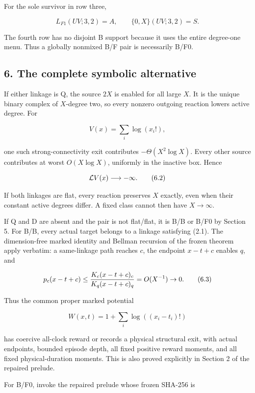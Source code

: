 For the sole survivor in row three,

\[
 L_{F1}(UV;3,2)=A,\qquad \{0,X\}(UV;3,2)=S.             \tag{5.2}
\]

The fourth row has no disjoint B support because it uses the entire
degree-one menu. Thus a globally nonmixed B/F pair is necessarily B/F0.

\subsection{6. The complete symbolic
alternative}

If either linkage is Q, the source \(2X\) is enabled for all large
\(X\). It is the unique binary complex of \(X\)-degree two, so every
nonzero outgoing reaction lowers active degree. For

\[
                         V(x)=\sum_i\log(x_i!),          \tag{6.1}
\]

one such strong-connectivity exit contributes \(-\Theta(X^2\log X)\).
Every other source contributes at worst \(O(X\log X)\), uniformly in the
inactive box. Hence

\[
                         {\cal L}V(x)\longrightarrow-\infty. \tag{6.2}
\]

If both linkages are flat, every reaction preserves \(X\) exactly, even
when their constant active degrees differ. A fixed class cannot then
have \(X\to\infty\).

If Q and D are absent and the pair is not flat/flat, it is B/B or B/F0
by Section 5. For B/B, every actual target belongs to a linkage
satisfying (2.1). The dimension-free marked identity and Bellman
recursion of the frozen theorem apply verbatim: a same-linkage path
reaches \(c\), the endpoint \(x-t+c\) enables \(q\), and

\[
                p_c(x-t+c)\le {K_c(x-t+c)_c\over
                                     K_q(x-t+c)_q}=O(X^{-1})\to0. \tag{6.3}
\]

Thus the common proper marked potential

\[
                     W(x,t)=1+\sum_i\log((x_i-t_i)!)    \tag{6.4}
\]

has coercive all-clock reward or records a physical structural exit,
with actual endpoints, bounded episode depth, all fixed positive reward
moments, and all fixed physical-duration moments. This is also proved
explicitly in Section 2 of the repaired prelude.

For B/F0, invoke the repaired prelude whose frozen SHA-256 is

